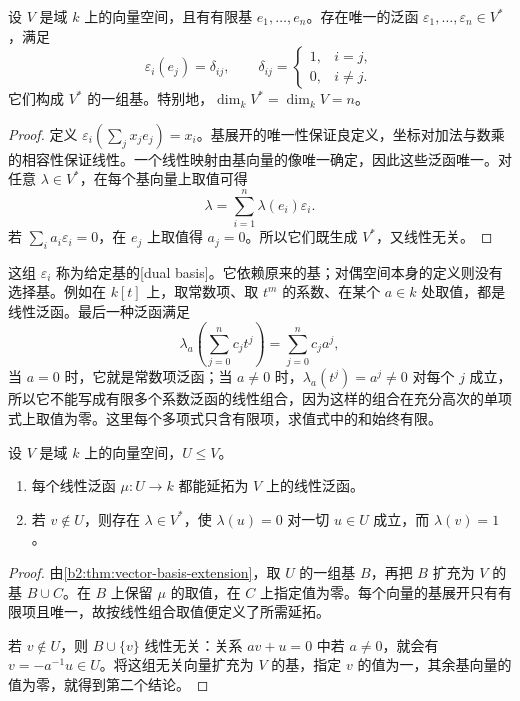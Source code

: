 \begin{proposition}[对偶基]\label{b2:prop:dual-basis}
	设 \(V\) 是域 \(k\) 上的向量空间，且有有限基 \(e_1,\ldots,e_n\)。存在唯一的泛函 \(\varepsilon_1,\ldots,\varepsilon_n\in V^*\)，满足
	\[
		\varepsilon_i(e_j)=\delta_{ij}, \qquad
		\delta_{ij}=\begin{cases}1,&i=j,\\0,&i\ne j.\end{cases}
	\]
	它们构成 \(V^*\) 的一组基。特别地，\(\dim_kV^*=\dim_kV=n\)。
\end{proposition}

\begin{proof}
	定义 \(\varepsilon_i(\sum_jx_je_j)=x_i\)。基展开的唯一性保证良定义，坐标对加法与数乘的相容性保证线性。一个线性映射由基向量的像唯一确定，因此这些泛函唯一。对任意 \(\lambda\in V^*\)，在每个基向量上取值可得
	\[
		\lambda=\sum_{i=1}^n\lambda(e_i)\varepsilon_i.
	\]
	若 \(\sum_i a_i\varepsilon_i=0\)，在 \(e_j\) 上取值得 \(a_j=0\)。所以它们既生成 \(V^*\)，又线性无关。
\end{proof}

这组 \(\varepsilon_i\) 称为给定基的[dual basis]。它依赖原来的基；对偶空间本身的定义则没有选择基。例如在 \(k[t]\) 上，取常数项、取 \(t^m\) 的系数、在某个 \(a\in k\) 处取值，都是线性泛函。最后一种泛函满足
\[
	\lambda_a\left(\sum_{j=0}^n c_jt^j\right)=\sum_{j=0}^n c_ja^j,
\]
当 \(a=0\) 时，它就是常数项泛函；当 \(a\ne0\) 时，\(\lambda_a(t^j)=a^j\ne0\) 对每个 \(j\) 成立，所以它不能写成有限多个系数泛函的线性组合，因为这样的组合在充分高次的单项式上取值为零。这里每个多项式只含有限项，求值式中的和始终有限。

\begin{lemma}[泛函的延拓与分离]\label{b2:lem:functional-extension}
	设 \(V\) 是域 \(k\) 上的向量空间，\(U\le V\)。
	\begin{enumerate}
		\item 每个线性泛函 \(\mu:U\to k\) 都能延拓为 \(V\) 上的线性泛函。
		\item 若 \(v\notin U\)，则存在 \(\lambda\in V^*\)，使 \(\lambda(u)=0\) 对一切 \(u\in U\) 成立，而 \(\lambda(v)=1\)。
	\end{enumerate}
\end{lemma}

\begin{proof}
	由\cref{b2:thm:vector-basis-extension}，取 \(U\) 的一组基 \(B\)，再把 \(B\) 扩充为 \(V\) 的基 \(B\cup C\)。在 \(B\) 上保留 \(\mu\) 的取值，在 \(C\) 上指定值为零。每个向量的基展开只有有限项且唯一，故按线性组合取值便定义了所需延拓。

	若 \(v\notin U\)，则 \(B\cup\{v\}\) 线性无关：关系 \(av+u=0\) 中若 \(a\ne0\)，就会有 \(v=-a^{-1}u\in U\)。将这组无关向量扩充为 \(V\) 的基，指定 \(v\) 的值为一，其余基向量的值为零，就得到第二个结论。
\end{proof}

